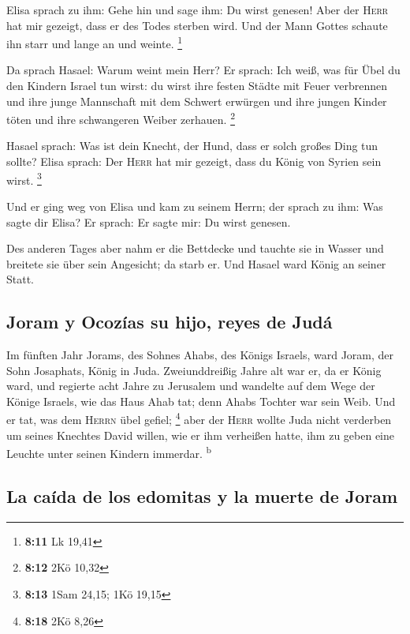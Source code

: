  Elisa sprach zu ihm: Gehe hin und sage ihm: Du wirst
genesen! Aber der \textsc{Herr} hat mir gezeigt, dass er des Todes
sterben wird.  Und der Mann Gottes schaute ihn starr und
lange an und weinte. \footnote{\textbf{8:11} Lk 19,41}

 Da sprach Hasael: Warum weint mein Herr? Er sprach: Ich
weiß, was für Übel du den Kindern Israel tun wirst: du wirst ihre festen
Städte mit Feuer verbrennen und ihre junge Mannschaft mit dem Schwert
erwürgen und ihre jungen Kinder töten und ihre schwangeren Weiber
zerhauen. \footnote{\textbf{8:12} 2Kö 10,32}

 Hasael sprach: Was ist dein Knecht, der Hund, dass er
solch großes Ding tun sollte? Elisa sprach: Der \textsc{Herr} hat mir
gezeigt, dass du König von Syrien sein wirst. \footnote{\textbf{8:13}
  1Sam 24,15; 1Kö 19,15}

 Und er ging weg von Elisa und kam zu seinem Herrn; der
sprach zu ihm: Was sagte dir Elisa? Er sprach: Er sagte mir: Du wirst
genesen.

 Des anderen Tages aber nahm er die Bettdecke und tauchte
sie in Wasser und breitete sie über sein Angesicht; da starb er. Und
Hasael ward König an seiner Statt.

\hypertarget{joram-y-ocozuxedas-su-hijo-reyes-de-juduxe1}{%
\subsection{Joram y Ocozías su hijo, reyes de
Judá}\label{joram-y-ocozuxedas-su-hijo-reyes-de-juduxe1}}

 Im fünften Jahr Jorams, des Sohnes Ahabs, des Königs
Israels, ward Joram, der Sohn Josaphats, König in Juda. 
Zweiunddreißig Jahre alt war er, da er König ward, und regierte acht
Jahre zu Jerusalem  und wandelte auf dem Wege der Könige
Israels, wie das Haus Ahab tat; denn Ahabs Tochter war sein Weib. Und er
tat, was dem \textsc{Herrn} übel gefiel; \footnote{\textbf{8:18} 2Kö
  8,26}  aber der \textsc{Herr} wollte Juda nicht
verderben um seines Knechtes David willen, wie er ihm verheißen hatte,
ihm zu geben eine Leuchte unter seinen Kindern immerdar.
\textsuperscript{b}

\hypertarget{la-cauxedda-de-los-edomitas-y-la-muerte-de-joram}{%
\subsection{La caída de los edomitas y la muerte de
Joram}\label{la-cauxedda-de-los-edomitas-y-la-muerte-de-joram}}

